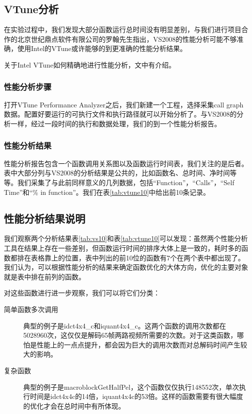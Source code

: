 \subsection{VTune分析}
\label{subsec:vtuneprofiling}

在实验过程中，我们发现大部分函数运行总时间没有明显差别，与我们进行项目合作的北京世纪鼎点软件有限公司的罗翰先生指出，VS2008的性能分析可能不够准确，使用Intel的VTune或许能够的到更准确的性能分析结果。

关于Intel VTune如何精确地进行性能分析，文中有介绍。

\subsubsection{性能分析步骤}
\label{subsubsec:profilingprocess}

打开VTune Performance Analyzer之后，我们新建一个工程，选择采集call graph数据。配置好要运行的可执行文件和执行路径就可以开始分析了。与VS2008的分析一样，经过一段时间的执行和数据处理，我们的到一个性能分析报告。

\subsubsection{性能分析结果}
\label{subsubsec:reportexerpt}



性能分析报告包含一个函数调用关系图以及函数运行时间表，我们关注的是后者。表中大部分列与VS2008的分析结果是公共的，比如函数名、总时间、净时间等等。我们采集了与此前同样意义的几列数据，包括“Function”，“Calls”，“Self Time”和“\% in function”。我们在表\ref{tab:vtune10}中给出前10条记录。

\subsection{性能分析结果说明}
\label{subsec:commentonreport}

我们观察两个分析结果表\ref{tab:vs10}和表\ref{tab:vtune10}可以发现：虽然两个性能分析工具在结果上存在一些差别，但函数运行时间的排序大体上是一致的，耗时多的函数都排在表格靠上的位置，表中列出的前10位的函数有7个在两个表中都出现了。我们认为，可以根据性能分析的结果来确定函数优化的大体方向，优化的主要对象就是表中排在前列的函数。

对这些函数进行进一步观察，我们可以将它们分类：
\begin{description}
\item[简单函数多次调用] 典型的例子是idct4x4\_c和iquant4x4\_c。这两个函数的调用次数都在5028960次，这仅仅是解码65帧两路视频所需要的次数。对于这类函数，哪怕是性能上的一点点提升，都会因为巨大的调用次数而对总解码时间产生较大的影响。
\item[复杂函数] 典型的例子是macroblockGetHalfPel，这个函数仅仅执行148552次，单次执行时间是idct4x4c的14倍，iquant4x4c的53倍。这样的函数需要有很大幅度的优化才会在总时间中有所体现。
\end{description}

